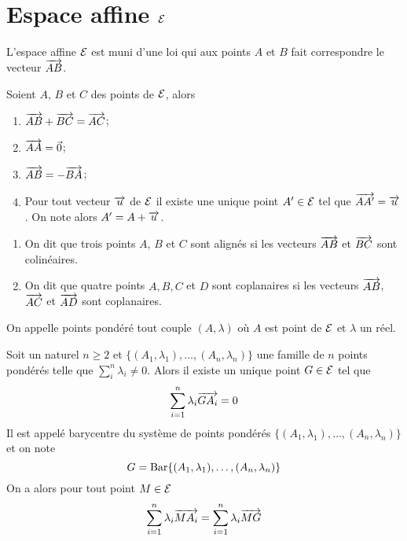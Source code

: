 \section{Espace affine \(\mathcal{E}\)}

L'espace affine \(\mathcal{E}\) est muni d'une loi qui aux points \(A\) et \(B\) fait correspondre le vecteur \(\overrightarrow{AB}\).

\begin{prop}
  Soient \(A\), \(B\) et \(C\) des points de \(\mathcal{E}\), alors
  \begin{enumerate}
  \item \(\overrightarrow{AB}+\overrightarrow{BC} = \overrightarrow{AC}\);
  \item \(\overrightarrow{AA}=\vec{0}\);
  \item \(\overrightarrow{AB} = -\overrightarrow{BA}\);
  \item Pour tout vecteur \(\overrightarrow{u}\) de \(\mathcal{E}\) il existe une unique point \(A' \in \mathcal{E}\) tel que \(\overrightarrow{AA'}=\overrightarrow{u}\). On note alors \(A'=A+\overrightarrow{u}\).
  \end{enumerate}
\end{prop}
\begin{defdef}
  \begin{enumerate}
  \item On dit que trois points \(A\), \(B\) et \(C\) sont alignés si les vecteurs \(\overrightarrow{AB}\) et \(\overrightarrow{BC}\) sont colinéaires.
  \item On dit que quatre points \(A, B, C\) et \(D\) sont coplanaires si les vecteurs \(\overrightarrow{AB}\), \(\overrightarrow{AC}\) et \(\overrightarrow{AD}\) sont coplanaires.
  \end{enumerate}
\end{defdef}
\begin{defdef}
  On appelle points pondéré tout couple \((A,\lambda)\) où \(A\) est point de \(\mathcal{E}\) et \(\lambda\) un réel.
\end{defdef}
\begin{prop}
Soit un naturel \(n \geq 2\) et \(\{(A_1,\lambda_1), \ldots, (A_n,\lambda_n)\}\) une famille de \(n\) points pondérés telle que \(\sum_i^n\lambda_i \neq 0\). Alors il existe un unique point \(G \in \mathcal{E}\) tel que
\begin{equation}
  \sum_{i=1}^n \lambda_i \overrightarrow{GA_i}=0
\end{equation}
Il est appelé barycentre du système de points pondérés \(\{(A_1,\lambda_1), \ldots, (A_n,\lambda_n)\}\) et on note
\begin{equation}
  G = \operatorname{Bar}\{(A_1,\lambda_1), \ldots, (A_n,\lambda_n)\}
\end{equation}
On a alors pour tout point \(M \in \mathcal{E}\)
\begin{equation}
  \sum_{i=1}^n \lambda_i \overrightarrow{MA_i} = \sum_{i=1}^n \lambda_i \overrightarrow{MG}
\end{equation}
\end{prop}
